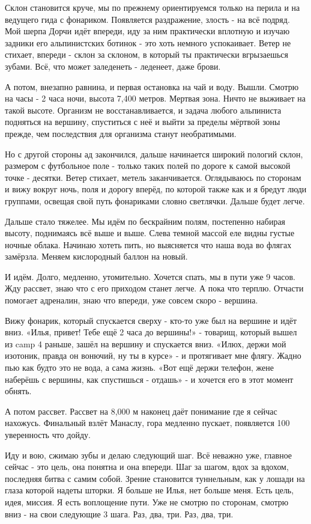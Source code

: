 Склон становится круче, мы по прежнему ориентируемся только на перила и на
ведущего гида с фонариком. Появляется раздражение, злость - на всё подряд. Мой
шерпа Дорчи идёт впереди, иду за ним практически вплотную и изучаю задники его
альпинистских ботинок - это хоть немного успокаивает. Ветер не стихает, впереди
- склон за склоном, в который ты практически вгрызаешься зубами. Всё, что может
заледенеть - леденеет, даже брови. 

А потом, внезапно равнина, и первая остановка на чай и воду. Вышли. Смотрю на
часы - 2 часа ночи, высота 7,400 метров. Мертвая зона. Ничто не выживает на
такой высоте. Организм не восстанавливается, и задача любого альпиниста
подняться на вершину, спуститься с неё и выйти за пределы мёртвой зоны прежде,
чем последствия для организма станут необратимыми. 

Но с другой стороны ад закончился, дальше начинается широкий пологий склон,
размером с футбольное поле - только таких полей по дороге к самой высокой точке
- десятки. Ветер стихает, метель заканчивается. Оглядываюсь по сторонам и вижу
вокруг ночь, поля и дорогу вперёд, по которой также как и я бредут люди
группами, освещая свой путь фонариками словно светлячки. Дальше будет легче. 

Дальше стало тяжелее. Мы идём по бескрайним полям, постепенно набирая высоту,
поднимаясь всё выше и выше. Слева темной массой еле видны густые ночные облака.
Начинаю хотеть пить, но выясняется что наша вода во флягах замёрзла. Меняем
кислородный баллон на новый. 

И идём. Долго, медленно, утомительно. Хочется спать, мы в пути уже 9 часов. Жду
рассвет, знаю что с его приходом станет легче. А пока что терплю. Отчасти
помогает адреналин, знаю что впереди, уже совсем скоро - вершина. 

Вижу фонарик, который спускается сверху - кто-то уже был на вершине и идёт
вниз. «Илья, привет! Тебе ещё 2 часа до вершины!» - товарищ, который вышел из
camp 4 раньше, зашёл на вершину и спускается вниз. «Илюх, держи мой изотоник,
правда он вонючий, ну ты в курсе» - и протягивает мне флягу. Жадно пью как
будто это не вода, а сама жизнь. «Вот ещё держи телефон, жене наберёшь с
вершины, как спустишься - отдашь» - и хочется его в этот момент обнять. 

А потом рассвет. Рассвет на 8,000 м наконец даёт понимание где я сейчас
нахожусь. Финальный взлёт Манаслу, гора медленно пускает, появляется 100%
уверенность что дойду. 

Иду и вою, сжимаю зубы и делаю следующий шаг. Всё неважно уже, главное сейчас -
это цель, она понятна и она впереди. Шаг за шагом, вдох за вдохом, последняя
битва с самим собой. Зрение становится туннельным, как у лошади на глаза
которой надеты шторки. Я больше не Илья, нет больше меня. Есть цель, идея,
миссия. Я есть воплощение пути. Уже не смотрю по сторонам, смотрю вниз - на
свои следующие 3 шага. Раз, два, три. Раз, два, три. 

